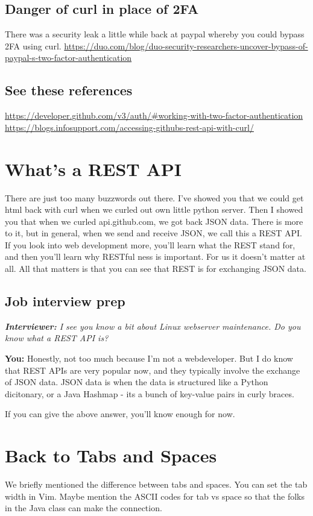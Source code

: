 \documentclass[10pt]{article}
\begin{document}
\subsection{Danger of curl in place of 2FA}
There was a security leak a little while back at paypal whereby you could bypass 2FA using curl.
\url{https://duo.com/blog/duo-security-researchers-uncover-bypass-of-paypal-s-two-factor-authentication}

\subsection{See these references}
\url{https://developer.github.com/v3/auth/#working-with-two-factor-authentication}
\url{https://blogs.infosupport.com/accessing-githubs-rest-api-with-curl/}

\section{What's a REST API}
There are just too many buzzwords out there. I've showed you that we could get html back with curl when we curled out own little python server. Then I showed you that when we curled api.github.com, we got back JSON data. There is more to it, but in general, when we send and receive JSON, we call this a REST API. If you look into web development more, you'll  learn what the REST stand for, and then you'll learn why RESTful ness is important. For us it doesn't matter at all. All that matters is that you can see that REST is for exchanging JSON data.

\subsection{Job interview prep}
\noindent\textit{\textbf{Interviewer:} I see you know a bit about Linux webserver maintenance. Do you know what a REST API is?}

\noindent \textbf{You: } Honestly, not too much because I'm not a webdeveloper. But I do know that REST APIs are very popular now, and they typically involve the exchange of JSON data. JSON data is when the data is structured like a Python dicitonary, or a Java Hashmap  - its a bunch of key-value pairs in curly braces.

If you can give the above answer, you'll know enough for now.

\section{Back to Tabs and Spaces}
We briefly mentioned the difference between tabs and spaces. You can set the tab width in Vim. Maybe mention the ASCII codes for tab vs space so that the folks in the Java class can make the connection.
\end{document}
